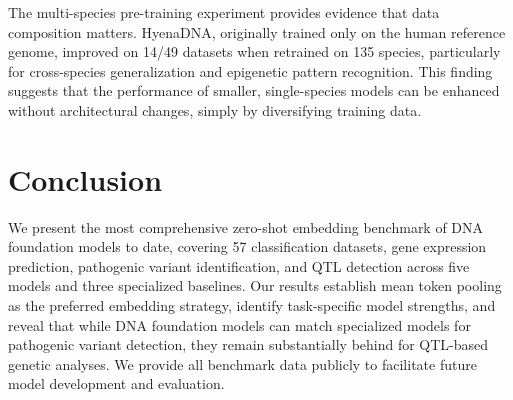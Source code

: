 \documentclass[11pt]{article}
\begin{document}
The multi-species pre-training experiment provides evidence that data composition matters.  HyenaDNA, originally trained only on the human reference genome, improved on 14/49 datasets when retrained on 135 species, particularly for cross-species generalization and epigenetic pattern recognition.  This finding suggests that the performance of smaller, single-species models can be enhanced without architectural changes, simply by diversifying training data.

\section{Conclusion}

We present the most comprehensive zero-shot embedding benchmark of DNA foundation models to date, covering 57 classification datasets, gene expression prediction, pathogenic variant identification, and QTL detection across five models and three specialized baselines.  Our results establish mean token pooling as the preferred embedding strategy, identify task-specific model strengths, and reveal that while DNA foundation models can match specialized models for pathogenic variant detection, they remain substantially behind for QTL-based genetic analyses.  We provide all benchmark data publicly to facilitate future model development and evaluation.



\end{document}
